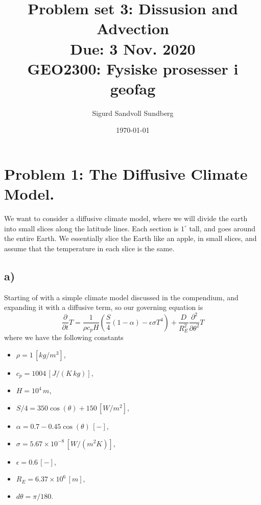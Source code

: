 \documentclass[10pt, a4paper]{amsart}
\title[Problem set 3]{Problem set 3: Dissusion and Advection\\
\normalsize{Due: 3 Nov. 2020} \\
  \hrulefill\small{GEO2300: Fysiske prosesser i geofag }\hrulefill}
\author[Sundberg]{Sigurd Sandvoll Sundberg}
\date{\today}
\begin{document}
\maketitle

\section{Problem 1: The Diffusive Climate Model.}
We want to consider a diffusive climate model, where we will divide the earth into small slices along the latitude lines. Each section is $1^\circ$ tall, and goes around the entire Earth. We essentially slice the Earth like an apple, in small slices, and assume that the temperature in each slice is the same. 
\subsection{a)}
Starting of with a simple climate model discussed in the compendium\cite{joe}, and expanding it with a diffusive term, so our governing equation is 
\begin{equation}\label{eq:a}
	\frac{\partial}{\partial t}T = \frac{1}{\rho c_pH} \left(\frac{S}{4}\left(1-\alpha\right) - \epsilon\sigma T^4\right) + \frac{D}{R_E^2}\frac{\partial^2}{\partial \theta^2}T
\end{equation}
where we have the following constants
\begin{itemize}
	\item $\rho = 1\,[kg/m^3]$,
	\item $c_p = 1004\,[J/(K\,kg)]$,
	\item $H = 10^4\,m$,
	\item $S/4 = 350\cos(\theta) + 150 \,[W/m^2]$,
	\item $\alpha = 0.7 - 0.45\cos(\theta)\, [-]$,
	\item $\sigma = 5.67 \times 10^{-8}\, [W/(m^2K)]$,
	\item $\epsilon = 0.6\, [-]$,
	\item $R_E = 6.37\times 10^6\,[m]$,
	\item $d\theta = \pi/180$.
\end{itemize}
\end{document}
